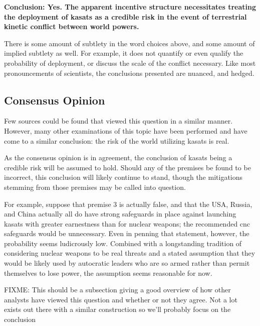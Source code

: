 \begin{blockquote}
  {\bf Conclusion: Yes.  The apparent incentive structure necessitates
    treating the deployment of \acp{kasat} as a credible risk in the
    event of terrestrial kinetic conflict between world powers.}
\end{blockquote}

There is some amount of subtlety in the word choices above, and some
amount of implied subtlety as well.  For example, it does not quantify
or even qualify the probability of deployment, or discuss the scale of
the conflict necessary.  Like most pronouncements of scientists, the
conclusions presented are nuanced, and hedged.

\subsection{Consensus Opinion}

Few sources could be found that viewed this question in a similar
manner.  However, many other examinations of this topic have been
performed and have come to a similar conclusion: the risk of the world
utilizing \acp{kasat} is real.

As the consensus opinion is in agreement, the conclusion of
\acp{kasat} being a credible risk will be assumed to hold.  Should any
of the premises be found to be incorrect, this conclusion will likely
continue to stand, though the mitigations stemming from those premises
may be called into question.

For example, suppose that premise 3 is actually false, and that the
USA, Russia, and China actually all do have strong safeguards in place
against launching \acp{kasat} with greater earnestness than for
nuclear weapons; the recommended \ac{cnc} safeguards would be
unnecessary.  Even in penning that statement, however, the probability
seems ludicrously low.  Combined with a longstanding tradition of
considering nuclear weapons to be real threats and a stated assumption
that they would be likely used by autocratic leaders who are so armed
rather than permit themselves to lose power\cite[that colonel]{xxx},
the assumption seems reasonable for now.

FIXME: This should be a subsection giving a good overview of how other
analysts have viewed this question and whether or not they agree.  Not
a lot exists out there with a similar construction so we'll probably
focus on the conclusion

